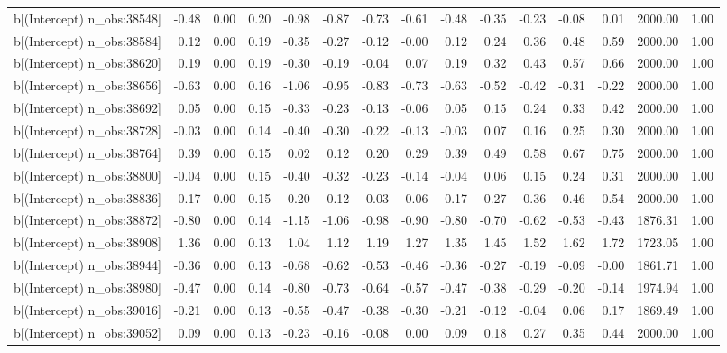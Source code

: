\begin{table}[ht]
\begin{tabular}{rrrrrrrrrrrrrrr}
  b[(Intercept) n\_obs:38548] & -0.48 & 0.00 & 0.20 & -0.98 & -0.87 & -0.73 & -0.61 & -0.48 & -0.35 & -0.23 & -0.08 & 0.01 & 2000.00 & 1.00 \\ 
  b[(Intercept) n\_obs:38584] & 0.12 & 0.00 & 0.19 & -0.35 & -0.27 & -0.12 & -0.00 & 0.12 & 0.24 & 0.36 & 0.48 & 0.59 & 2000.00 & 1.00 \\ 
  b[(Intercept) n\_obs:38620] & 0.19 & 0.00 & 0.19 & -0.30 & -0.19 & -0.04 & 0.07 & 0.19 & 0.32 & 0.43 & 0.57 & 0.66 & 2000.00 & 1.00 \\ 
  b[(Intercept) n\_obs:38656] & -0.63 & 0.00 & 0.16 & -1.06 & -0.95 & -0.83 & -0.73 & -0.63 & -0.52 & -0.42 & -0.31 & -0.22 & 2000.00 & 1.00 \\ 
  b[(Intercept) n\_obs:38692] & 0.05 & 0.00 & 0.15 & -0.33 & -0.23 & -0.13 & -0.06 & 0.05 & 0.15 & 0.24 & 0.33 & 0.42 & 2000.00 & 1.00 \\ 
  b[(Intercept) n\_obs:38728] & -0.03 & 0.00 & 0.14 & -0.40 & -0.30 & -0.22 & -0.13 & -0.03 & 0.07 & 0.16 & 0.25 & 0.30 & 2000.00 & 1.00 \\ 
  b[(Intercept) n\_obs:38764] & 0.39 & 0.00 & 0.15 & 0.02 & 0.12 & 0.20 & 0.29 & 0.39 & 0.49 & 0.58 & 0.67 & 0.75 & 2000.00 & 1.00 \\ 
  b[(Intercept) n\_obs:38800] & -0.04 & 0.00 & 0.15 & -0.40 & -0.32 & -0.23 & -0.14 & -0.04 & 0.06 & 0.15 & 0.24 & 0.31 & 2000.00 & 1.00 \\ 
  b[(Intercept) n\_obs:38836] & 0.17 & 0.00 & 0.15 & -0.20 & -0.12 & -0.03 & 0.06 & 0.17 & 0.27 & 0.36 & 0.46 & 0.54 & 2000.00 & 1.00 \\ 
  b[(Intercept) n\_obs:38872] & -0.80 & 0.00 & 0.14 & -1.15 & -1.06 & -0.98 & -0.90 & -0.80 & -0.70 & -0.62 & -0.53 & -0.43 & 1876.31 & 1.00 \\ 
  b[(Intercept) n\_obs:38908] & 1.36 & 0.00 & 0.13 & 1.04 & 1.12 & 1.19 & 1.27 & 1.35 & 1.45 & 1.52 & 1.62 & 1.72 & 1723.05 & 1.00 \\ 
  b[(Intercept) n\_obs:38944] & -0.36 & 0.00 & 0.13 & -0.68 & -0.62 & -0.53 & -0.46 & -0.36 & -0.27 & -0.19 & -0.09 & -0.00 & 1861.71 & 1.00 \\ 
  b[(Intercept) n\_obs:38980] & -0.47 & 0.00 & 0.14 & -0.80 & -0.73 & -0.64 & -0.57 & -0.47 & -0.38 & -0.29 & -0.20 & -0.14 & 1974.94 & 1.00 \\ 
  b[(Intercept) n\_obs:39016] & -0.21 & 0.00 & 0.13 & -0.55 & -0.47 & -0.38 & -0.30 & -0.21 & -0.12 & -0.04 & 0.06 & 0.17 & 1869.49 & 1.00 \\ 
  b[(Intercept) n\_obs:39052] & 0.09 & 0.00 & 0.13 & -0.23 & -0.16 & -0.08 & 0.00 & 0.09 & 0.18 & 0.27 & 0.35 & 0.44 & 2000.00 & 1.00 \\ 

\end{tabular}
\end{table}
